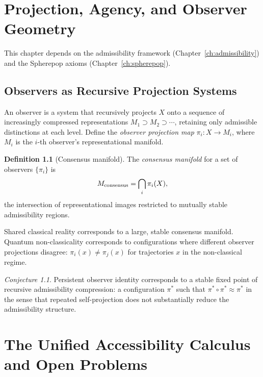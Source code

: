 \documentclass[11pt, openright, twoside]{book}
\theoremstyle{plain}
\theoremstyle{definition}
\newtheorem{definition}[theorem]{Definition}
\theoremstyle{remark}
\newtheorem{conjecture}[theorem]{Conjecture}
\newcommand{\Traj}{X}
\newcommand{\Rep}{M}
\newcommand{\proj}{\pi}
\begin{document}
\chapter{Projection, Agency, and Observer Geometry}

\begin{depbox}
This chapter depends on the admissibility framework (Chapter~\ref{ch:admissibility}) and
the Spherepop axioms (Chapter~\ref{ch:spherepop}).
\end{depbox}

\section{Observers as Recursive Projection Systems}

An observer is a system that recursively projects $\Traj$ onto a sequence of increasingly
compressed representations $\Rep_1\supset\Rep_2\supset\cdots$, retaining only admissible
distinctions at each level. Define the \emph{observer projection map}
$\proj_i:\Traj\to\Rep_i$, where $\Rep_i$ is the $i$-th observer's representational manifold.

\begin{definition}[Consensus manifold]
The \emph{consensus manifold} for a set of observers $\{\proj_i\}$ is
\begin{equation}
  \Rep_{\rm consensus} = \bigcap_i\proj_i(\Traj),
\end{equation}
the intersection of representational images restricted to mutually stable admissibility regions.
\end{definition}

Shared classical reality corresponds to a large, stable consensus manifold. Quantum
non-classicality corresponds to configurations where different observer projections disagree:
$\proj_i(x)\neq\proj_j(x)$ for trajectories $x$ in the non-classical regime.

\begin{conjecture}
Persistent observer identity corresponds to a stable fixed point of recursive admissibility
compression: a configuration $\proj^*$ such that $\proj^*\circ\proj^*\approx\proj^*$ in
the sense that repeated self-projection does not substantially reduce the admissibility structure.
\end{conjecture}

\chapter{The Unified Accessibility Calculus and Open Problems}
\end{document}
